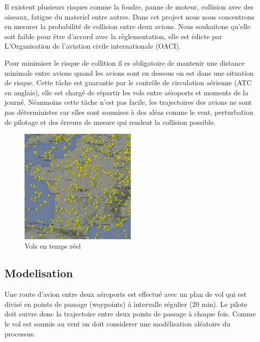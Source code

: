 \documentclass[a4paper, 12pt,twoside]{article}
\numberwithin{equation}{subsection}
\begin{document}
	Il existent plusieurs risques comme la foudre, panne de moteur, collision avec des oiseaux, fatigue du materiel entre autres. Dans cet project nous nous concentrons en mesurer la probabilité de collision entre deux avions. Nous souhaitons qu'elle soit faible pour être d'accord avec la règlementation, elle est édicte par L'Organisation de l'aviation civile internationale (OACI).
	
	Pour minimiser le risque de collition il es obligatoire de mantenir une distance minimale entre avions quand les avions sont en dessous on est dans une situation de risque. Cette tâche est guarantie par le contrôle de circulation aérienne (ATC en anglais), elle est chargé de répartir les vols entre aéroports et moments de la journé. Néanmoins cette tâche n'est pas facile, les trajectoires des avions ne sont pas déterministes car elles sont soumises à des aléas comme le vent, perturbation de pilotage et des érreurs de mesure qui rendent la collision possible.
	
	\begin{figure}[htbp]
		\centering
			\includegraphics[width=0.5\textwidth]{Images/VolsFrance}
		\caption{Vols en temps réel}
		\label{fig:Vols}
	\end{figure}
	
	
	\subsection{Modelisation} %
	\label{sub:modelisation}
	
	Une route d'avion entre deux aéroports est effectué avec un plan de vol qui est divisé en points de passage (waypoints) à intervalle régulier (20 min). Le pilote doit suivre donc la trajectoire entre deux points de passage à chaque fois. Comme le vol est soumis au vent on doit considerer une modélisation aléatoire du processus.
	
\end{document}
